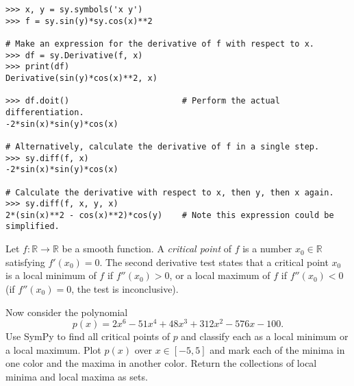 \begin{lstlisting}
>>> x, y = sy.symbols('x y')
>>> f = sy.sin(y)*sy.cos(x)**2

# Make an expression for the derivative of f with respect to x.
>>> df = sy.Derivative(f, x)
>>> print(df)
Derivative(sin(y)*cos(x)**2, x)

>>> df.doit()                       # Perform the actual differentiation.
-2*sin(x)*sin(y)*cos(x)

# Alternatively, calculate the derivative of f in a single step.
>>> sy.diff(f, x)
-2*sin(x)*sin(y)*cos(x)

# Calculate the derivative with respect to x, then y, then x again.
>>> sy.diff(f, x, y, x)
2*(sin(x)**2 - cos(x)**2)*cos(y)    # Note this expression could be simplified.
\end{lstlisting}

\begin{problem} %
Let $f:\mathbb{R}\rightarrow\mathbb{R}$ be a smooth function.
A \emph{critical point} of $f$ is a number $x_0\in\mathbb{R}$ satisfying $f'(x_0) = 0$.
The second derivative test states that a critical point $x_0$ is a local minimum of $f$ if $f''(x_0) > 0$, or a local maximum of $f$ if $f''(x_0) < 0$ (if $f''(x_0) = 0$, the test is inconclusive).

Now consider the polynomial
\[
p(x) = 2x^6 - 51x^4 + 48x^3 + 312x^2 - 576x - 100.
\]
Use SymPy to find all critical points of $p$ and classify each as a local minimum or a local maximum.
Plot $p(x)$ over $x\in[-5,5]$ and mark each of the minima in one color and the maxima in another color.
Return the collections of local minima and local maxima as sets.
\end{problem}

